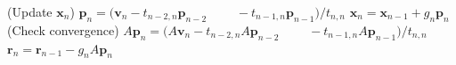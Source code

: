 \begin{algorithm}[H]
\begin{algorithmic}[1]
\State ({Update} $\bm x_n$)
\State $\bm p_n=(\bm v_n-t_{n-2,n}\bm p_{n-2}$
\State $\qquad-t_{n-1,n}\bm p_{n-1})/t_{n,n}$
\State $\bm x_n=\bm x_{n-1}+g_n\bm p_n$
\State ({Check convergence})
\State $A\bm p_n=(A\bm v_n-t_{n-2,n}A\bm p_{n-2}$
\State $\qquad-t_{n-1,n}A\bm p_{n-1})/t_{n,n}$
\State $\bm r_n=\bm r_{n-1}-g_nA\bm p_n$
\EndFor\end{algorithmic}\end{algorithm}
